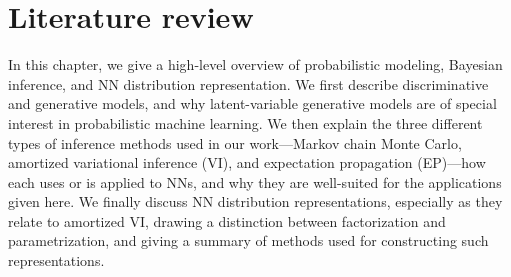 \chapter{Literature review}
\label{chp:lit-review}
In this chapter, we give a high-level overview of probabilistic modeling, Bayesian inference, and NN distribution representation. We first describe discriminative and generative models, and why latent-variable generative models are of special interest in probabilistic machine learning. We then explain the three different types of inference methods used in our work---Markov chain Monte Carlo, amortized variational inference (VI), and expectation propagation (EP)---how each uses or is applied to NNs, and why they are well-suited for the applications given here. We finally discuss NN distribution representations, especially as they relate to amortized VI, drawing a distinction between factorization and parametrization, and giving a summary of methods used for constructing such representations.




